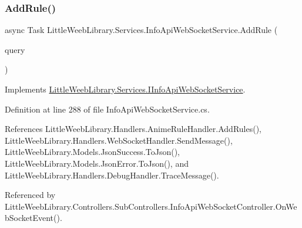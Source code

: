 \mbox{\label{class_little_weeb_library_1_1_services_1_1_info_api_web_socket_service_a0ed7b2a1d1fe30b43d06232719570435}} 
\subsubsection{\texorpdfstring{Add\+Rule()}{AddRule()}}
{\footnotesize\ttfamily async Task Little\+Weeb\+Library.\+Services.\+Info\+Api\+Web\+Socket\+Service.\+Add\+Rule (\begin{DoxyParamCaption}\item[{J\+Object}]{query }\end{DoxyParamCaption})}



Implements \mbox{\hyperlink{interface_little_weeb_library_1_1_services_1_1_i_info_api_web_socket_service_a93dc6813e6d9fbda4710075dc9963a89}{Little\+Weeb\+Library.\+Services.\+I\+Info\+Api\+Web\+Socket\+Service}}.



Definition at line 288 of file Info\+Api\+Web\+Socket\+Service.\+cs.



References Little\+Weeb\+Library.\+Handlers.\+Anime\+Rule\+Handler.\+Add\+Rules(), Little\+Weeb\+Library.\+Handlers.\+Web\+Socket\+Handler.\+Send\+Message(), Little\+Weeb\+Library.\+Models.\+Json\+Success.\+To\+Json(), Little\+Weeb\+Library.\+Models.\+Json\+Error.\+To\+Json(), and Little\+Weeb\+Library.\+Handlers.\+Debug\+Handler.\+Trace\+Message().



Referenced by Little\+Weeb\+Library.\+Controllers.\+Sub\+Controllers.\+Info\+Api\+Web\+Socket\+Controller.\+On\+Web\+Socket\+Event().


